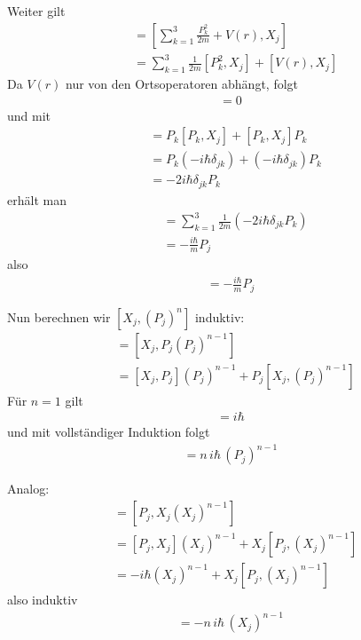 \documentclass[11pt,a4paper]{scrartcl}
\begin{document}
\begin{enumerate}[label=(\alph*)]
\begin{tcolorbox}[title=Berechnung, breakable]
        Weiter gilt
        \begin{align*}
            [H,X_j] &= \left[\sum\limits_{k=1}^3 \frac{P_k^2}{2m} + V(r), X_j\right]\\
            &= \sum\limits_{k=1}^3 \frac{1}{2m}[P_k^2,X_j] + [V(r),X_j]
        \end{align*}
        Da $V(r)$ nur von den Ortsoperatoren abhängt, folgt
        \begin{align*}
            [V(r),X_j] = 0
        \end{align*}
        und mit
        \begin{align*}
            [P_k^2,X_j] &= P_k[P_k,X_j] + [P_k,X_j]P_k\\
            &= P_k(-i\hbar\delta_{jk}) + (-i\hbar\delta_{jk})P_k\\
            &= -2i\hbar\delta_{jk}P_k
        \end{align*}
        erhält man
        \begin{align*}
            [H,X_j] &= \sum\limits_{k=1}^3 \frac{1}{2m}(-2i\hbar\delta_{jk}P_k)\\
            &= -\frac{i\hbar}{m}P_j
        \end{align*}
        also
        \begin{align*}
            [H,X_j] = -\frac{i\hbar}{m}P_j
        \end{align*}

        Nun berechnen wir $[X_j,(P_j)^n]$ induktiv:
        \begin{align*}
            [X_j,(P_j)^n] &= [X_j,P_j(P_j)^{n-1}]\\
            &= [X_j,P_j](P_j)^{n-1} + P_j[X_j,(P_j)^{n-1}]
        \end{align*}
        Für $n=1$ gilt
        \begin{align*}
            [X_j,P_j] = i\hbar
        \end{align*}
        und mit vollständiger Induktion folgt
        \begin{align*}
            [X_j,(P_j)^n] = n\,i\hbar\,(P_j)^{n-1}
        \end{align*}

        Analog:
        \begin{align*}
            [P_j,(X_j)^n] &= [P_j,X_j(X_j)^{n-1}]\\
            &= [P_j,X_j](X_j)^{n-1} + X_j[P_j,(X_j)^{n-1}]\\
            &= -i\hbar (X_j)^{n-1} + X_j[P_j,(X_j)^{n-1}]
        \end{align*}
        also induktiv
        \begin{align*}
            [P_j,(X_j)^n] = -n\,i\hbar\,(X_j)^{n-1}
        \end{align*}


\end{tcolorbox}
\end{enumerate}
\end{document}
